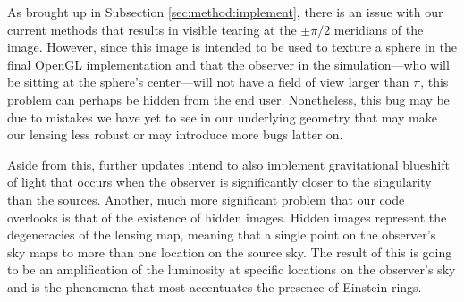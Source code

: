 \documentclass{standalone}
\begin{document}
As brought up in Subsection \ref{sec:method:implement}, there is an issue with our current methods that results in visible tearing at the $\pm\pi/2$ meridians of the image.
However, since this image is intended to be used to texture a sphere in the final OpenGL implementation and that the observer in the simulation---who will be sitting at the sphere's center---will not have a field of view larger than $\pi$, this problem can perhaps be hidden from the end user.
Nonetheless, this bug may be due to mistakes we have yet to see in our underlying geometry that may make our lensing less robust or may introduce more bugs latter on.

Aside from this, further updates intend to also implement gravitational blueshift of light that occurs when the observer is significantly closer to the singularity than the sources.
Another, much more significant problem that our code overlooks is that of the existence of hidden images.
Hidden images represent the degeneracies of the lensing map, meaning that a single point on the observer's sky maps to more than one location on the source sky.
The result of this is going to be an amplification of the luminosity at specific locations on the observer's sky and is the phenomena that most accentuates the presence of Einstein rings.
\end{document}
